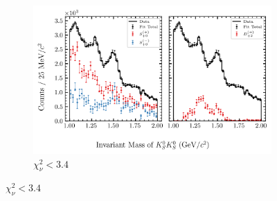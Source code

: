 \begin{figure}[htbp]
    \begin{subfigure}{0.8\textwidth}
        \includegraphics[width=\linewidth]{figures/binned_fit_chisqdof_3.4_splot_D_1s_2b_phase_factor_waves29099_uncertainty_bootstrap-CI-BC.png}
        \caption{$\chi^2_\nu < 3.4$}
    \end{subfigure}

    \vspace{1em}


\end{figure}

